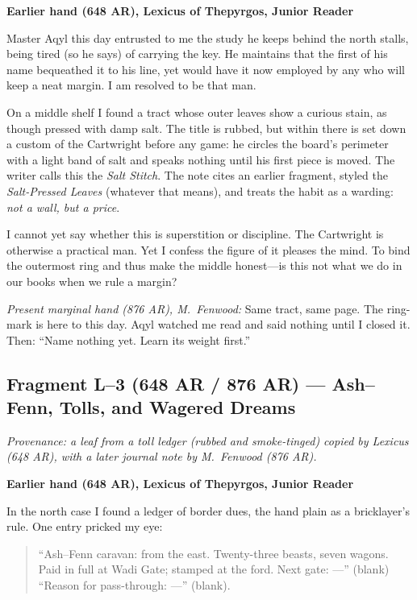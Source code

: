 \documentclass[11pt]{article}
\begin{document}
\medskip
\noindent\textbf{Earlier hand (648 AR), Lexicus of Thepyrgos, Junior Reader}

Master Aqyl this day entrusted to me the study he keeps behind the north stalls, being tired (so he says) of carrying the key. He maintains that the first of his name bequeathed it to his line, yet would have it now employed by any who will keep a neat margin. I am resolved to be that man.

On a middle shelf I found a tract whose outer leaves show a curious stain, as though pressed with damp salt. The title is rubbed, but within there is set down a custom of the Cartwright before any game: he circles the board's perimeter with a light band of salt and speaks nothing until his first piece is moved. The writer calls this the \textit{Salt Stitch}. The note cites an earlier fragment, styled the \textit{Salt-Pressed Leaves} (whatever that means), and treats the habit as a warding: \emph{not a wall, but a price}.

I cannot yet say whether this is superstition or discipline. The Cartwright is otherwise a practical man. Yet I confess the figure of it pleases the mind. To bind the outermost ring and thus make the middle honest---is this not what we do in our books when we rule a margin?

\medskip
\noindent\textit{Present marginal hand (876 AR), M.\ Fenwood:} Same tract, same page. The ring-mark is here to this day. Aqyl watched me read and said nothing until I closed it. Then: ``Name nothing yet. Learn its weight first.''


\subsection{Fragment L--3 (648 AR / 876 AR) --- Ash--Fenn, Tolls, and Wagered Dreams}
\label{frag:l3}
{}

\noindent\textit{Provenance: a leaf from a toll ledger (rubbed and smoke-tinged) copied by Lexicus (648 AR), with a later journal note by M.\ Fenwood (876 AR).}

\medskip
\noindent\textbf{Earlier hand (648 AR), Lexicus of Thepyrgos, Junior Reader}

In the north case I found a ledger of border dues, the hand plain as a bricklayer’s rule. One entry pricked my eye:

\begin{quote}
\small
``Ash--Fenn caravan: from the east. Twenty-three beasts, seven wagons. Paid in full at Wadi Gate; stamped at the ford. Next gate: ---'' (blank) ``Reason for pass-through: ---'' (blank).
\end{quote}
\end{document}
